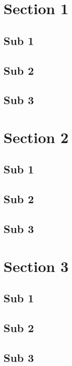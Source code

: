 \documentclass[10pt]{article}
\begin{document}
\tableofcontents
\listoffigures
\listoftables

\newpage


\section{Section 1}
\blindtext
\subsection{Sub 1}
\blindtext
\subsection{Sub 2}
\blindtext
\subsection{Sub 3}
\blindtext

\section{Section 2}
\blindtext
\subsection{Sub 1}
\blindtext
\subsection{Sub 2}
\blindtext
\subsection{Sub 3}
\blindtext

\section{Section 3}
\blindtext
\subsection{Sub 1}
\blindtext
\subsection{Sub 2}
\blindtext
\subsection{Sub 3}
\blindtext

\newpage
\printbibliography
\end{document}
